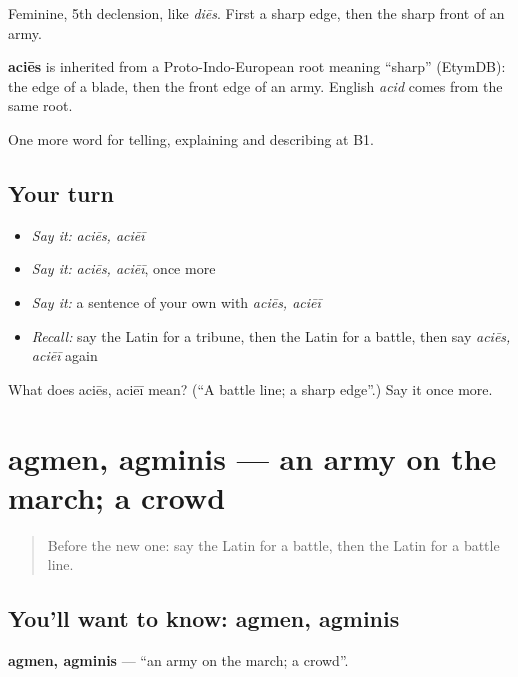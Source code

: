 Feminine, 5th declension, like \emph{diēs}. First a sharp edge, then the sharp front of an army.

\begin{cousinweb}
\textbf{aciēs} is inherited from a Proto-Indo-European root meaning \textquotedblleft{}sharp\textquotedblright{} (EtymDB): the edge of a blade, then the front edge of an army. English \emph{acid} comes from the same root.
\end{cousinweb}

\begin{grammarlens}[title={What you've built}]
One more word for telling, explaining and describing at B1.
\end{grammarlens}

\subsection*{Your turn}
\begin{itemize}
\raggedright
  \item \emph{Say it:} \emph{aciēs, aciēī}
  \item \emph{Say it:} \emph{aciēs, aciēī}, once more
  \item \emph{Say it:} a sentence of your own with \emph{aciēs, aciēī}
  \item \emph{Recall:} say the Latin for a tribune, then the Latin for a battle, then say \emph{aciēs, aciēī} again
\end{itemize}

\begin{tcolorbox}[breakable,colback=teal!4,colframe=teal!35!black,title={Before you move on}]
What does aciēs, aciēī mean? (\textquotedblleft{}A battle line; a sharp edge\textquotedblright{}.) Say it once more.
\end{tcolorbox}
\section[agmen, agminis]{agmen, agminis — an army on the march; a crowd}

\label{lesson:LA-C339-agmen}



\begin{quote}
Before the new one: say the Latin for a battle, then the Latin for a battle line.
\end{quote}

\subsection*{You'll want to know: agmen, agminis}
\textbf{agmen, agminis} — \textquotedblleft{}an army on the march; a crowd\textquotedblright{}.

